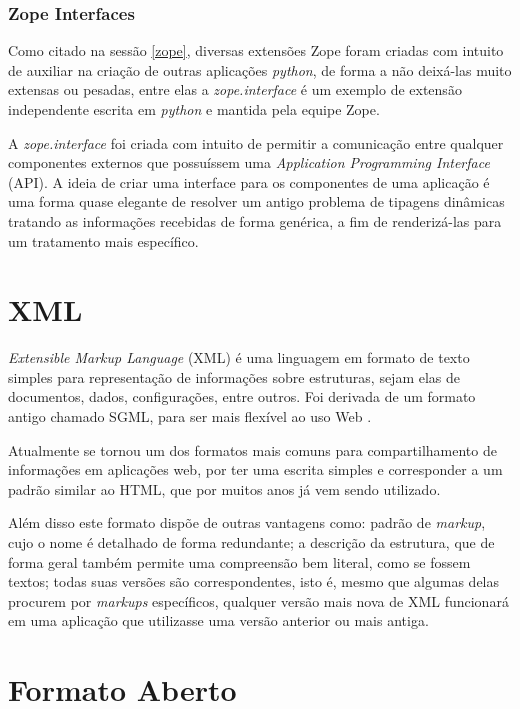 \subsubsection{Zope Interfaces}

Como citado na sessão \ref{zope}, diversas extensões Zope foram criadas com intuito de auxiliar na criação de outras aplicações \textit{python}, de forma a não deixá-las muito extensas ou pesadas, entre elas a \textit{zope.interface} é um exemplo de extensão independente escrita em \textit{python} e mantida pela equipe Zope.

A \textit{zope.interface} foi criada com intuito de permitir a comunicação entre qualquer componentes externos que possuíssem uma \textit{Application Programming Interface} (API). A ideia de criar uma interface para os componentes de uma aplicação é uma forma quase elegante de resolver um antigo problema de tipagens dinâmicas tratando as informações recebidas de forma genérica, a fim de renderizá-las para um tratamento mais específico.

\section{XML}

\textit{Extensible Markup Language} (XML) é uma linguagem em formato de texto simples para representação de informações sobre estruturas, sejam elas de documentos, dados, configurações, entre outros. Foi derivada de um formato antigo chamado SGML, para ser mais flexível ao uso Web \cite{W3C-XML}.

Atualmente se tornou um dos formatos mais comuns para compartilhamento de informações em aplicações web, por ter uma escrita simples e corresponder a um padrão similar ao HTML, que por muitos anos já vem sendo utilizado.

Além disso este formato dispõe de outras vantagens como: padrão de \textit{markup}, cujo o nome é detalhado de forma redundante; a descrição da estrutura, que de forma geral também permite uma compreensão bem literal, como se fossem textos; todas suas versões são correspondentes, isto é, mesmo que algumas delas procurem por \textit{markups} específicos, qualquer versão mais nova de XML funcionará em uma aplicação que utilizasse uma versão anterior ou mais antiga.

\section{Formato Aberto}

